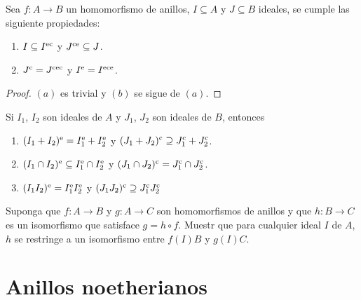 \begin{proposition}
  Sea $f\colon A \to B$ un homomorfismo de anillos, $I\subseteq A$ y $J\subseteq B$ ideales, se cumple las siguiente propiedades:
  \begin{enumerate}
    \item $I \subseteq I^{\mathrm{e}\mathrm{c}}$ y $J^{\mathrm{c}\mathrm{e}} \subseteq J$.
    \item $J^{\mathrm{c}} = J^{\mathrm{c}\mathrm{e}\mathrm{c}}$ y $I^{\mathrm{e}} = I^{\mathrm{e}\mathrm{c}\mathrm{e}}$.
  \end{enumerate}
\end{proposition}
\begin{proof}
  $(a)$ es trivial y $(b)$ se sigue de $(a)$.
\end{proof}




\ExerciseSection

\begin{exerciseList}
  \item Si $I_1$, $I_2$ son ideales de $A$ y $J_1$, $J_2$ son ideales de $B$, entonces
    \begin{enumerate}
      \item $(I_1+I_2)^{\mathrm{e}} = I_1^{\mathrm{e}} + I_2^{\mathrm{e}}$ y $(J_1+J_2)^{\mathrm{c}} \supseteq J_1^{\mathrm{c}} + J_2^{\mathrm{c}}$.
      \item $(I_1 \cap I_2)^{\mathrm{e}} \subseteq I_1^{\mathrm{e}} \cap I_2^{\mathrm{e}}$ y $(J_1 \cap J_2)^{\mathrm{c}} = J_1^{\mathrm{c}} \cap J_2^{\mathrm{c}}$.
      \item $(I_1 I_2)^{\mathrm{e}} = I_1^{\mathrm{e}} I_2^{\mathrm{e}}$ y $(J_1 J_2)^{\mathrm{c}} \supseteq J_1^{\mathrm{c}} J_2^{\mathrm{c}}$
    \end{enumerate}

  \item Suponga que $f\colon A \to B $ y $g\colon A \to C$ son homomorfismos de anillos y que $h\colon B \to C$ es un isomorfismo que satisface $g = h \circ f$. Muestr que para cualquier ideal $I$ de $A$, $h$ se restringe a un isomorfismo entre $f(I)B$ y $g(I)C$.
\end{exerciseList}




\section{Anillos noetherianos}

